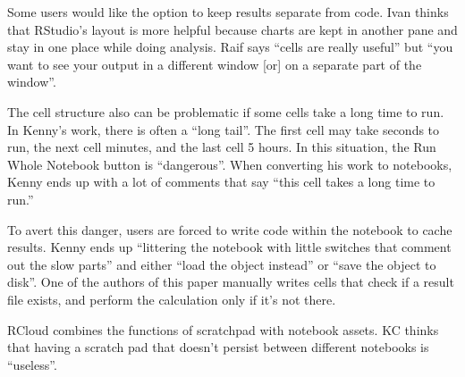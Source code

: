 Some users would like the option to keep results separate from code.
Ivan thinks that RStudio's layout is more helpful because charts
are kept in another pane and stay in one place while doing analysis. Raif says
``cells are really useful'' but ``you want to see your output in a different
window [or] on a separate part of the window''.

The cell structure also can be problematic if some cells take a long time to
run. In Kenny's work, there is often a ``long tail''.  The first cell may take
seconds to run, the next cell minutes, and the last cell 5 hours.  In this
situation, the Run Whole Notebook button is ``dangerous''. When converting
his work to notebooks, Kenny ends up with a lot of comments that say ``this cell
takes a long time to run.''

To avert this danger, users are forced to write code within the notebook to
cache results. Kenny ends up ``littering the notebook with little switches that
comment out the slow parts'' and either ``load the object instead'' or ``save
the object to disk''. One of the authors of this paper manually writes cells
that check if a result file exists, and perform the calculation only if it's not
there.


RCloud combines the functions of scratchpad with notebook assets. KC thinks
that having a scratch pad that doesn't persist between different notebooks is
``useless''.




